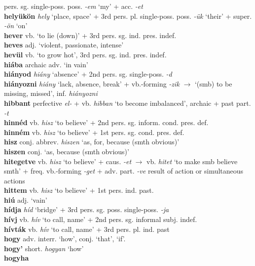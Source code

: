 \documentclass[11pt]{article}
\begin{document}
pers. sg. single\hyp{}poss. poss. \emph{-em} `my' + acc. \emph{-et}
\\ \textbf{helyükön} \emph{hely} `place, space' + 3rd
pers. pl. single\hyp{}poss. poss. \emph{-ük} `their' +
super. \emph{-ön} `on' \\ \textbf{hever} vb. `to lie (down)' + 3rd
pers. sg. ind. pres. indef. \\ \textbf{heves} adj. `violent,
passionate, intense' \\ \textbf{hevül} vb. `to grow hot', 3rd
pers. sg. ind. pres. indef. \\ \textbf{hiába} archaic adv. `in vain'
\\ \textbf{hiányod} \emph{hiány} `absence' + 2nd pers.
sg. single\hyp{}poss. \emph{-d} \\ \textbf{hiányozni} \emph{hiány}
`lack, absence, break' + vb.-forming \emph{-zik} $\rightarrow$ `(smb)
to be missing, missed', inf. \emph{hiányozni} \\ \textbf{hibbant}
perfective \emph{el-} + vb. \emph{hibban} `to become
imbalanced', archaic + past part. \emph{-t} \\ \textbf{hinnéd}
vb. \emph{hisz} `to believe' + 2nd
pers. sg. inform. cond. pres. def. \\ \textbf{hinném} vb. \emph{hisz}
`to believe' + 1st pers. sg. cond. pres. def. \\ \textbf{hisz}
conj. abbrev. \emph{hiszen} `as, for, because (smth obvious)'
\\ \textbf{hiszen} conj. `as, because (smth obvious)'
\\ \textbf{hitegetve} vb. \emph{hisz} `to believe' + caus. \emph{-et}
$\rightarrow$ vb. \emph{hitet} `to make smb believe smth' +
freq. vb.\hyp{}forming \emph{-get} + adv. part. \emph{-ve} result of
action or simultaneous actions \\ \textbf{hittem} vb. \emph{hisz} `to
believe' + 1st pers. ind. past. \\ \textbf{hiú} adj. `vain'
\\ \textbf{hídja} \emph{híd} `bridge' + 3rd
pers. sg. poss. single\hyp{}poss. \emph{-ja} \\ \textbf{hívj}
vb. \emph{hív} `to call, name' + 2nd pers. sg. informal
subj. indef. \\ \textbf{hívták} vb. \emph{hív} `to call, name' + 3rd
pers. pl. ind. past \\ \textbf{hogy} adv. interr. `how', conj. `that',
`if'. \\ \textbf{hogy'} short. \emph{hogyan} `how' \\ \textbf{hogyha}
\end{document}
